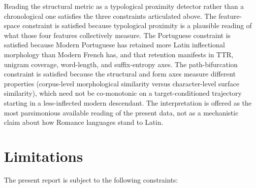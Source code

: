 \documentclass[11pt]{article}
\begin{document}
Reading the structural metric as a typological proximity detector rather
than a chronological one satisfies the three constraints articulated above.
The feature-space constraint is satisfied because typological proximity is
a plausible reading of what those four features collectively measure. The Portuguese constraint
is satisfied because Modern Portuguese has retained more Latin inflectional
morphology than Modern French has, and that retention manifests in TTR,
unigram coverage, word-length, and suffix-entropy axes. The path-bifurcation
constraint is satisfied because the structural and form axes measure
different properties (corpus-level morphological similarity versus
character-level surface similarity), which need not be co-monotonic on a
target-conditioned trajectory starting in a less-inflected modern descendant.
The interpretation is offered as the most parsimonious available reading
of the present data, not as a mechanistic claim about how Romance languages
stand to Latin.

\section{Limitations}

The present report is subject to the following constraints:
\end{document}
